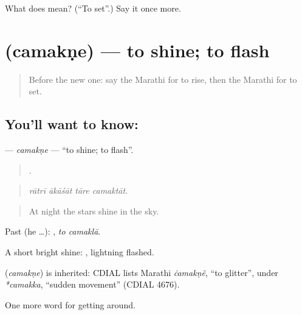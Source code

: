 \begin{tcolorbox}[breakable,colback=teal!4,colframe=teal!35!black,title={Before you move on}]
What does  mean? (\textquotedblleft{}To set\textquotedblright{}.) Say it once more.
\end{tcolorbox}
\section[\texorpdfstring{\mr{चमकणे} (camakṇe)}{चमकणे (camakṇe)}]{ (camakṇe) — to shine; to flash}

\label{lesson:MR-C441-camakne}



\begin{quote}
Before the new one: say the Marathi for to rise, then the Marathi for to set.
\end{quote}

\subsection*{You'll want to know: }
\textbf{} — \emph{camakṇe} — \textquotedblleft{}to shine; to flash\textquotedblright{}.

\begin{quote}
   .
\end{quote}

\begin{quote}
\emph{rātrī ākāśāt tāre camaktāt.}
\end{quote}

\begin{quote}
At night the stars shine in the sky.
\end{quote}

Past (he …):  , \emph{to camaklā}.

A short bright shine:  , lightning flashed.

\begin{cousinweb}
\textbf{} (\emph{camakṇe}) is inherited: CDIAL lists Marathi \emph{ċamakṇẽ}, \textquotedblleft{}to glitter\textquotedblright{}, under \emph{*camakka}, \textquotedblleft{}sudden movement\textquotedblright{} (CDIAL 4676).
\end{cousinweb}

\begin{grammarlens}[title={What you've built}]
One more word for getting around.
\end{grammarlens}

